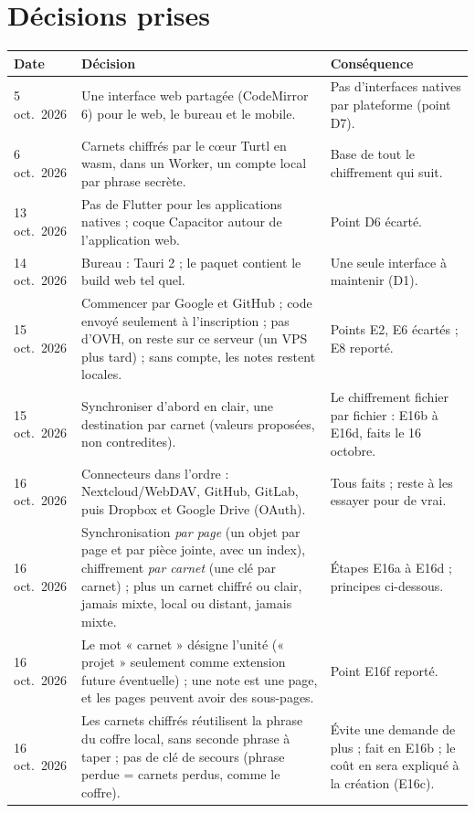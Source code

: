 \documentclass[10pt,a4paper]{article}
\begin{document}
\section{Décisions prises}
{\footnotesize\setlength{\tabcolsep}{4pt}\renewcommand{\arraystretch}{1.15}
\begin{longtable}{@{}p{2.0cm} p{7.0cm} p{7.0cm}@{}}
\toprule \textbf{Date} & \textbf{Décision} & \textbf{Conséquence}\\ \midrule\endhead
5 oct.\ 2026 & Une interface web partagée (CodeMirror 6) pour le web, le bureau et le mobile. & Pas d'interfaces natives par plateforme (point D7). \\ \midrule
6 oct.\ 2026 & Carnets chiffrés par le cœur Turtl en wasm, dans un Worker, un compte local par phrase secrète. & Base de tout le chiffrement qui suit. \\ \midrule
13 oct.\ 2026 & Pas de Flutter pour les applications natives ; coque Capacitor autour de l'application web. & Point D6 écarté. \\ \midrule
14 oct.\ 2026 & Bureau : Tauri 2 ; le paquet contient le build web tel quel. & Une seule interface à maintenir (D1). \\ \midrule
15 oct.\ 2026 & Commencer par Google et GitHub ; code envoyé seulement à l'inscription ; pas d'OVH, on reste sur ce serveur (un VPS plus tard) ; sans compte, les notes restent locales. & Points E2, E6 écartés ; E8 reporté. \\ \midrule
15 oct.\ 2026 & Synchroniser d'abord en clair, une destination par carnet (valeurs proposées, non contredites). & Le chiffrement fichier par fichier : E16b à E16d, faits le 16 octobre. \\ \midrule
16 oct.\ 2026 & Connecteurs dans l'ordre : Nextcloud/WebDAV, GitHub, GitLab, puis Dropbox et Google Drive (OAuth). & Tous faits ; reste à les essayer pour de vrai. \\
\midrule
16 oct.\ 2026 & Synchronisation \emph{par page} (un objet par page et par pièce jointe, avec un index), chiffrement \emph{par carnet} (une clé par carnet) ; plus un carnet chiffré ou clair, jamais mixte, local ou distant, jamais mixte. & Étapes E16a à E16d ; principes ci-dessous. \\ \midrule
16 oct.\ 2026 & Le mot « carnet » désigne l'unité (« projet » seulement comme extension future éventuelle) ; une note est une page, et les pages peuvent avoir des sous-pages. & Point E16f reporté. \\ \midrule
16 oct.\ 2026 & Les carnets chiffrés réutilisent la phrase du coffre local, sans seconde phrase à taper ; pas de clé de secours (phrase perdue = carnets perdus, comme le coffre). & Évite une demande de plus ; fait en E16b ; le coût en sera expliqué à la création (E16c). \\
\end{longtable}}
\end{document}
